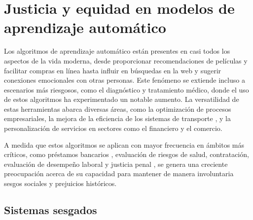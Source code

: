 \chapter{Justicia y equidad en modelos de aprendizaje autom\'atico}\label{chapter:state-of-the-art}


Los algoritmos de aprendizaje autom\'atico est\'an presentes en casi todos los aspectos de la vida moderna,
desde proporcionar recomendaciones de pel\'iculas y facilitar compras en l\'inea hasta influir en b\'usquedas en la web
y sugerir conexiones emocionales con otras personas. Este fen\'omeno se extiende incluso a escenarios m\'as riesgosos,
como el diagn\'ostico y tratamiento m\'edico, donde el uso de estos algoritmos ha experimentado un notable aumento.
La versatilidad de estas herramientas abarca diversas \'areas, como la optimizaci\'on de procesos empresariales, la 
mejora de la eficiencia de los sistemas de transporte \parencite{autonomous_driving}, y la personalizaci\'on de servicios en 
sectores como el financiero y el comercio.

A medida que estos algoritmos se aplican con mayor frecuencia en \'ambitos m\'as cr\'iticos, como
pr\'estamos bancarios \parencite{fairness_def}, evaluaci\'on de riesgos de salud, contrataci\'on, evaluaci\'on de desempe\~no laboral y
justicia penal \parencite{compas}, se genera una creciente preocupaci\'on acerca de su capacidad para mantener de manera involuntaria 
sesgos sociales y prejuicios hist\'oricos. 

\section{Sistemas sesgados}

